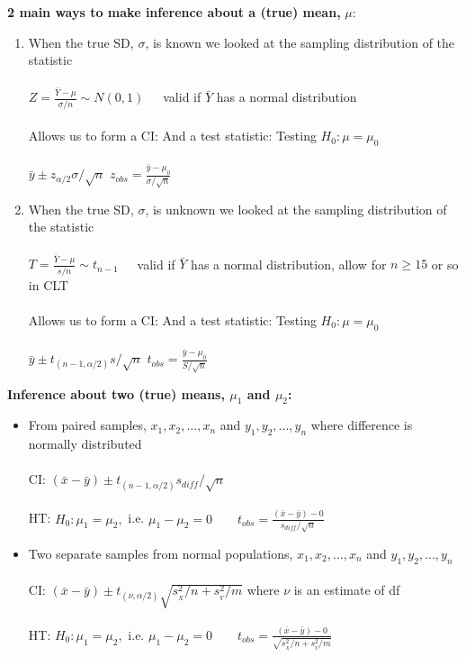 \noindent\large \textbf{2 main ways to make inference about a (true) mean,} $\mu$:\normalsize\\
\begin{enumerate}
\item When the true SD, $\sigma$, is known we looked at the sampling distribution of the statistic\\~\\
$Z=\frac{\bar{Y}-\mu}{\sigma/n} \sim N(0,1)$~~~valid if $\bar{Y}$ has a normal distribution\\~\\
Allows us to form a CI:	\hspace{2in}		And a test statistic: Testing $H_0: \mu=\mu_0$\\~\\
$\bar{y}\pm z_{\alpha/2}\sigma/\sqrt{n}$ \hspace{2.5in} $z_{obs}=\frac{\bar{y}-\mu_0}{\sigma/\sqrt{n}}$\\

\item When the true SD, $\sigma$, is unknown we looked at the sampling distribution of the statistic\\~\\
$T=\frac{\bar{Y}-\mu}{s/n} \sim t_{n-1}$~~~valid if $\bar{Y}$ has a normal distribution, allow for $n\geq 15$ or so in CLT\\~\\
Allows us to form a CI:	\hspace{2in}		And a test statistic: Testing $H_0: \mu=\mu_0$\\~\\
$\bar{y}\pm t_{(n-1,\alpha/2)}s/\sqrt{n}$ \hspace{2.4in} $t_{obs}=\frac{\bar{y}-\mu_0}{S/\sqrt{n}}$\\
\end{enumerate}

\newpage

\noindent\large \textbf{Inference about two (true) means, $\mu_1$ and $\mu_2$:}\normalsize\\
\begin{itemize}
\item	From paired samples, $x_1, x_2,..., x_n$ and $y_1, y_2,..., y_n$ where difference is normally distributed\\~\\
CI: $(\bar{x}-\bar{y})\pm t_{(n-1,\alpha/2)}s_{diff}/\sqrt{n}$\\~\\
HT: $H_0: \mu_1=\mu_2,$ i.e. $\mu_1-\mu_2=0$~~~~$t_{obs}=\frac{(\bar{x}-\bar{y})-0}{s_{diff}/\sqrt{n}}$
\item Two separate samples from normal populations, $x_1, x_2,..., x_n$ and $y_1, y_2,..., y_n$\\~\\
CI: $(\bar{x}-\bar{y})\pm t_{(\nu,\alpha/2)}\sqrt{s_{_X}^2/n+s_{_Y}^2/m}$ where $\nu$ is an estimate of df\\~\\
HT: $H_0: \mu_1=\mu_2,$ i.e. $\mu_1-\mu_2=0$~~~~$t_{obs}=\frac{(\bar{x}-\bar{y})-0}{\sqrt{s_{_X}^2/n+s_{_Y}^2/m}}$
\end{itemize}


